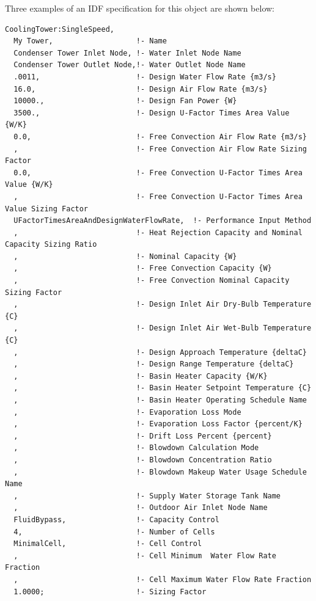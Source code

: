 Three examples of an IDF specification for this object are shown below:

\begin{lstlisting}
CoolingTower:SingleSpeed,
  My Tower,                   !- Name
  Condenser Tower Inlet Node, !- Water Inlet Node Name
  Condenser Tower Outlet Node,!- Water Outlet Node Name
  .0011,                      !- Design Water Flow Rate {m3/s}
  16.0,                       !- Design Air Flow Rate {m3/s}
  10000.,                     !- Design Fan Power {W}
  3500.,                      !- Design U-Factor Times Area Value {W/K}
  0.0,                        !- Free Convection Air Flow Rate {m3/s}
  ,                           !- Free Convection Air Flow Rate Sizing Factor
  0.0,                        !- Free Convection U-Factor Times Area Value {W/K}
  ,                           !- Free Convection U-Factor Times Area Value Sizing Factor
  UFactorTimesAreaAndDesignWaterFlowRate,  !- Performance Input Method
  ,                           !- Heat Rejection Capacity and Nominal Capacity Sizing Ratio
  ,                           !- Nominal Capacity {W}
  ,                           !- Free Convection Capacity {W}
  ,                           !- Free Convection Nominal Capacity Sizing Factor
  ,                           !- Design Inlet Air Dry-Bulb Temperature {C}
  ,                           !- Design Inlet Air Wet-Bulb Temperature {C}
  ,                           !- Design Approach Temperature {deltaC}
  ,                           !- Design Range Temperature {deltaC}
  ,                           !- Basin Heater Capacity {W/K}
  ,                           !- Basin Heater Setpoint Temperature {C}
  ,                           !- Basin Heater Operating Schedule Name
  ,                           !- Evaporation Loss Mode
  ,                           !- Evaporation Loss Factor {percent/K}
  ,                           !- Drift Loss Percent {percent}
  ,                           !- Blowdown Calculation Mode
  ,                           !- Blowdown Concentration Ratio
  ,                           !- Blowdown Makeup Water Usage Schedule Name
  ,                           !- Supply Water Storage Tank Name
  ,                           !- Outdoor Air Inlet Node Name
  FluidBypass,                !- Capacity Control
  4,                          !- Number of Cells
  MinimalCell,                !- Cell Control
  ,                           !- Cell Minimum  Water Flow Rate Fraction
  ,                           !- Cell Maximum Water Flow Rate Fraction
  1.0000;                     !- Sizing Factor


\end{lstlisting}
